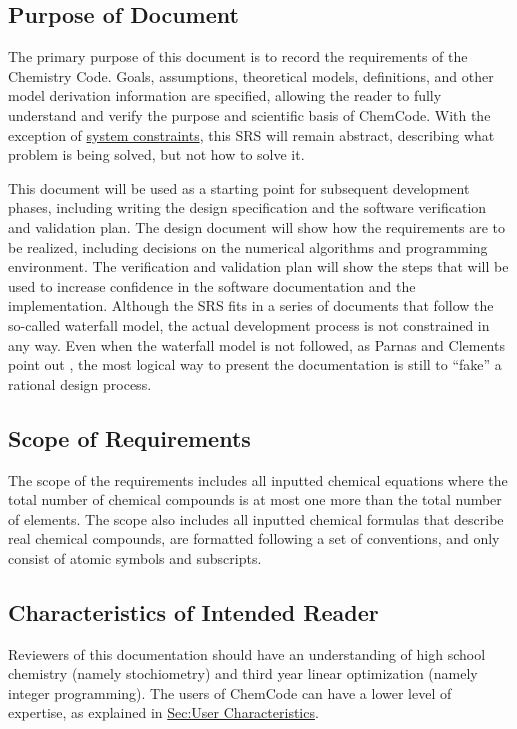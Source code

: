 \documentclass[12pt]{article}
\begin{document}
\subsection{Purpose of Document}
\label{Sec:DocPurpose}
The primary purpose of this document is to record the requirements of the Chemistry Code. Goals, assumptions, theoretical models, definitions, and other model derivation information are specified, allowing the reader to fully understand and verify the purpose and scientific basis of ChemCode. With the exception of \hyperref[Sec:SysConstraints]{system constraints}, this SRS will remain abstract, describing what problem is being solved, but not how to solve it.

This document will be used as a starting point for subsequent development phases, including writing the design specification and the software verification and validation plan. The design document will show how the requirements are to be realized, including decisions on the numerical algorithms and programming environment. The verification and validation plan will show the steps that will be used to increase confidence in the software documentation and the implementation. Although the SRS fits in a series of documents that follow the so-called waterfall model, the actual development process is not constrained in any way. Even when the waterfall model is not followed, as Parnas and Clements point out \cite{parnasClements1986}, the most logical way to present the documentation is still to ``fake'' a rational design process.

\subsection{Scope of Requirements}
\label{Sec:ReqsScope}
The scope of the requirements includes all inputted chemical equations where the total number of chemical compounds is at most one more than the total number of elements. The scope also includes all inputted chemical formulas that describe real chemical compounds, are formatted following a set of conventions, and only consist of atomic symbols and subscripts.

\subsection{Characteristics of Intended Reader}
\label{Sec:ReaderChars}
Reviewers of this documentation should have an understanding of high school chemistry (namely stochiometry) and third year linear optimization (namely integer programming). The users of ChemCode can have a lower level of expertise, as explained in \hyperref[Sec:UserChars]{Sec:User Characteristics}.
\end{document}
